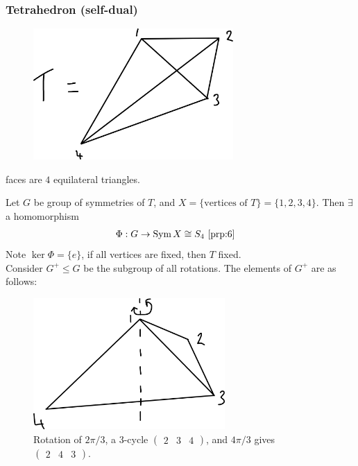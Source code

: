 \subsubsection{Tetrahedron (self-dual)}

\begin{figure}
    \centering 
    \includegraphics[height=5cm]{figures/07-tetrahedron}
\end{figure} faces are $4$ equilateral triangles.

Let $G$ be group of symmetries of $T$, and $X = \{\text{vertices of } T\} = \{1, 2, 3, 4\}$.
Then $\exists$ a homomorphism
\begin{align*}
    \Phi : G &\to \operatorname{Sym} X \cong S_4 \text{ \Cref{prp:6}}
\end{align*} 
Note $\ker \Phi = \{ e \}$, if all vertices are fixed, then $T$ fixed. \\
Consider $G^+ \leq G$ be the subgroup of all rotations.
The elements of $G^+$ are as follows:

\begin{figure}
    \centering 
    \includegraphics[height=5cm]{figures/07-tetrahedron-rotations} 
    \caption{Rotation of $2 \pi / 3$, a 3-cycle $\begin{pmatrix}2 & 3 & 4\end{pmatrix}$, and $4 \pi / 3$ gives $\begin{pmatrix}2 & 4 & 3\end{pmatrix}$.}
\end{figure}

